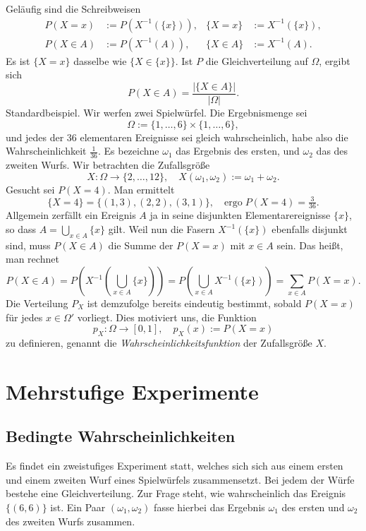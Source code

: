Geläufig sind die Schreibweisen
\begin{align*}
P(X=x) &:= P(X^{-1}(\{x\})), & \{X=x\} &:= X^{-1}(\{x\}),\\
P(X\in A) &:= P(X^{-1}(A)), & \{X\in A\} &:= X^{-1}(A).
\end{align*}
Es ist $\{X=x\}$ dasselbe wie $\{X\in\{x\}\}$. 
Ist $P$ die Gleichverteilung auf $\Omega$, ergibt sich
\[P(X\in A) = \frac{|\{X\in A\}|}{|\Omega|}.\]
Standardbeispiel. Wir werfen zwei Spielwürfel.
Die Ergebnismenge sei%
\[\Omega := \{1,\ldots,6\}\times\{1,\ldots,6\},\]
und jedes der 36 elementaren Ereignisse sei gleich wahrscheinlich, habe
also die Wahrscheinlichkeit $\tfrac{1}{36}$.
Es bezeichne $\omega_1$ das Ergebnis des ersten, und $\omega_2$
das des zweiten Wurfs. Wir betrachten die Zufallsgröße%
\[X\colon\Omega\to\{2,\ldots,12\},\quad
X(\omega_1,\omega_2) := \omega_1+\omega_2.\]
Gesucht sei $P(X=4)$. Man ermittelt
\[\{X=4\} = \{(1,3), (2,2), (3,1)\},\quad\text{ergo}\;P(X=4) = \tfrac{3}{36}.\]
Allgemein zerfällt ein Ereignis $A$ ja in seine disjunkten Elementarereignisse
$\{x\}$, so dass $A = \bigcup_{x\in A} \{x\}$ gilt. Weil nun die
Fasern $X^{-1}(\{x\})$ ebenfalls disjunkt sind, muss $P(X\in A)$ die
Summe der $P(X=x)$ mit $x\in A$ sein. Das heißt, man rechnet%
\[P(X\in A) = P(X^{-1}(\bigcup_{x\in A} \{x\})) = P(\bigcup_{x\in A} X^{-1}(\{x\}))
= \sum_{x\in A} P(X=x).\]
Die Verteilung $P_X$ ist demzufolge bereits eindeutig bestimmt,
sobald $P(X=x)$ für jedes $x\in\Omega'$ vorliegt. Dies motiviert
uns, die Funktion
\[p_X\colon\Omega\to[0,1],\quad p_X(x) := P(X=x)\]
zu definieren, genannt die \emph{Wahrscheinlichkeitsfunktion} der
Zufallsgröße $X$.

\newpage
\section{Mehrstufige Experimente}

\subsection{Bedingte Wahrscheinlichkeiten}

Es findet ein zweistufiges Experiment statt, welches sich sich
aus einem ersten und einem zweiten Wurf eines Spielwürfels
zusammensetzt. Bei jedem der Würfe bestehe eine Gleichverteilung.
Zur Frage steht, wie wahrscheinlich das Ereignis $\{(6,6)\}$ ist.
Ein Paar $(\omega_1,\omega_2)$ fasse hierbei das Ergebnis $\omega_1$
des ersten und $\omega_2$ des zweiten Wurfs zusammen.

